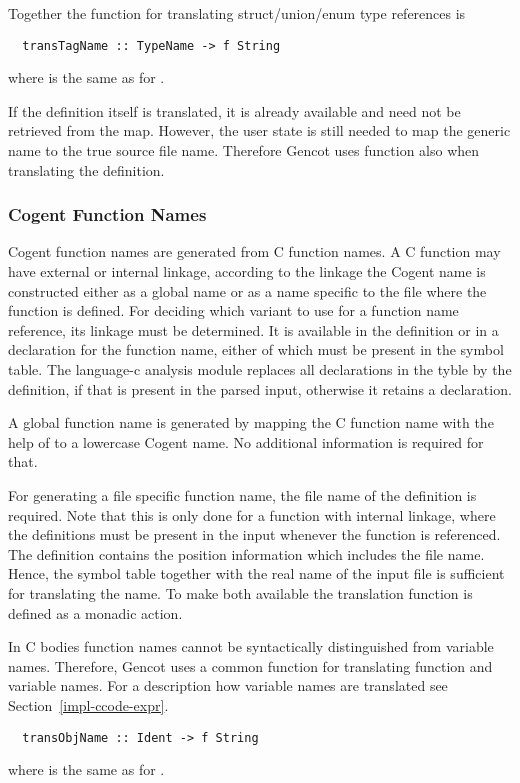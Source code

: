 Together the function for translating struct/union/enum type references is
\begin{verbatim}
  transTagName :: TypeName -> f String
\end{verbatim}
where  is the same as for .

If the definition itself is translated, it is already available and need not be retrieved from the map. 
However, the user state is still needed to map the generic name  to the true source file 
name. Therefore Gencot uses function  also when translating the definition.

\subsubsection{Cogent Function Names}

Cogent function names are generated from C function names. A C function may have external or internal
linkage, according to the linkage the Cogent name is constructed either as a global name or as a name specific
to the file where the function is defined. For deciding which variant to use for a function name reference,
its linkage must be determined. It is available in the definition or in a declaration for the function name,
either of which must be present in the symbol table. The language-c analysis module replaces all 
declarations in the tyble by the
definition, if that is present in the parsed input, otherwise it retains a declaration. 

A global function name is generated by mapping the C function name with the help of  to
a lowercase Cogent name. No additional information is required for that.

For generating a file specific function name, the file name of the definition is required. Note that 
this is only done for a function with internal linkage, where the definitions must be present in
the input whenever the function is referenced. The definition contains the position information
which includes the file name. Hence, the symbol table together with the real name of the input file 
is sufficient for translating the name. To make both available the translation function is defined as 
a monadic action.

In C bodies function names cannot be syntactically distinguished from variable names. Therefore, Gencot
uses a common function for translating function and variable names. For a description how variable
names are translated see Section~\ref{impl-ccode-expr}.
\begin{verbatim}
  transObjName :: Ident -> f String
\end{verbatim}
where  is the same as for .

